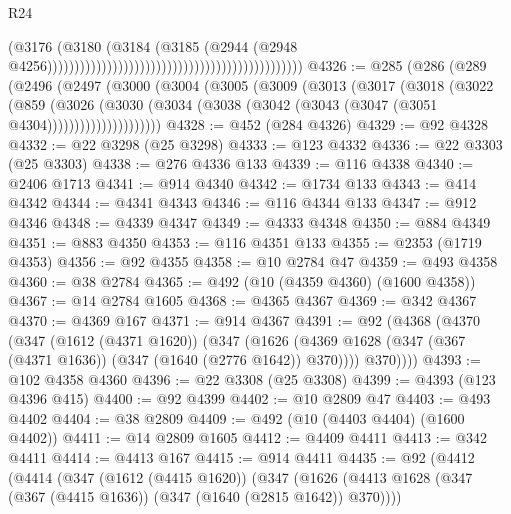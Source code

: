 \begin{lexlean}{R24}
\begin{coremodule}
                                                                                      (@3176
                                                                                        (@3180
                                                                                          (@3184
                                                                                            (@3185
                                                                                              (@2944
                                                                                                (@2948
                                                                                                  @4256)))))))))))))))))))))))))))))))))))))))))))))))
@4326 := @285
    (@286
      (@289
        (@2496
          (@2497
            (@3000
              (@3004
                (@3005
                  (@3009
                    (@3013
                      (@3017
                        (@3018
                          (@3022
                            (@859
                              (@3026
                                (@3030
                                  (@3034
                                    (@3038 (@3042 (@3043 (@3047 (@3051 @4304)))))))))))))))))))))
@4328 := @452 (@284 @4326)
@4329 := @92 @4328
@4332 := @22 @3298 (@25 @3298)
@4333 := @123 @4332
@4336 := @22 @3303 (@25 @3303)
@4338 := @276 @4336 @133
@4339 := @116 @4338
@4340 := @2406 @1713
@4341 := @914 @4340
@4342 := @1734 @133
@4343 := @414 @4342
@4344 := @4341 @4343
@4346 := @116 @4344 @133
@4347 := @912 @4346
@4348 := @4339 @4347
@4349 := @4333 @4348
@4350 := @884 @4349
@4351 := @883 @4350
@4353 := @116 @4351 @133
@4355 := @2353 (@1719 @4353)
@4356 := @92 @4355
@4358 := @10 @2784 @47
@4359 := @493 @4358
@4360 := @38 @2784
@4365 := @492 (@10 (@4359 @4360) (@1600 @4358))
@4367 := @14 @2784 @1605
@4368 := @4365 @4367
@4369 := @342 @4367
@4370 := @4369 @167
@4371 := @914 @4367
@4391 := @92
    (@4368
      (@4370
        (@347
          (@1612 (@4371 @1620))
          (@347
            (@1626 (@4369 @1628 (@347 (@367 (@4371 @1636)) (@347 (@1640 (@2776 @1642)) @370))))
            @370))))
@4393 := @102 @4358 @4360
@4396 := @22 @3308 (@25 @3308)
@4399 := @4393 (@123 @4396 @415)
@4400 := @92 @4399
@4402 := @10 @2809 @47
@4403 := @493 @4402
@4404 := @38 @2809
@4409 := @492 (@10 (@4403 @4404) (@1600 @4402))
@4411 := @14 @2809 @1605
@4412 := @4409 @4411
@4413 := @342 @4411
@4414 := @4413 @167
@4415 := @914 @4411
@4435 := @92
    (@4412
      (@4414
        (@347
          (@1612 (@4415 @1620))
          (@347
            (@1626 (@4413 @1628 (@347 (@367 (@4415 @1636)) (@347 (@1640 (@2815 @1642)) @370))))

\end{coremodule}
\end{lexlean}
